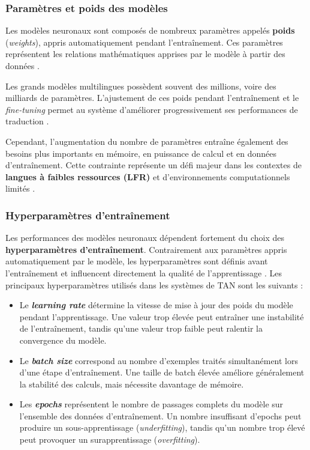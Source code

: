 \subsubsection{Paramètres et poids des modèles}

Les modèles neuronaux sont composés de nombreux paramètres appelés \textbf{poids} (\textit{weights}), appris automatiquement pendant l'entraînement. Ces paramètres représentent les relations mathématiques apprises par le modèle à partir des données \cite{Goodfellow-et-al-2016}.

Les grands modèles multilingues possèdent souvent des millions, voire des milliards de paramètres. L'ajustement de ces poids pendant l'entraînement et le \textit{fine-tuning} permet au système d'améliorer progressivement ses performances de traduction \cite{rakhimov2024enhancing}.

Cependant, l'augmentation du nombre de paramètres entraîne également des besoins plus importants en mémoire, en puissance de calcul et en données d'entraînement. Cette contrainte représente un défi majeur dans les contextes de \textbf{langues à faibles ressources (\ac{LFR})} et d'environnements computationnels limités \cite{agyei2025dynamic}.
\subsubsection{Hyperparamètres d'entraînement}

Les performances des modèles neuronaux dépendent fortement du choix des \textbf{hyperparamètres d'entraînement}. Contrairement aux paramètres appris automatiquement par le modèle, les hyperparamètres sont définis avant l'entraînement et influencent directement la qualité de l'apprentissage \cite{Goodfellow-et-al-2016}. Les principaux hyperparamètres utilisés dans les systèmes de \ac{TAN} sont les suivants :

\begin{itemize}

    \item Le \textbf{\textit{learning rate}} détermine la vitesse de mise à jour des poids du modèle pendant l'apprentissage. Une valeur trop élevée peut entraîner une instabilité de l'entraînement, tandis qu'une valeur trop faible peut ralentir la convergence du modèle.

    \item Le \textbf{\textit{batch size}} correspond au nombre d'exemples traités simultanément lors d'une étape d'entraînement. Une taille de batch élevée améliore généralement la stabilité des calculs, mais nécessite davantage de mémoire.

    \item Les \textbf{\textit{epochs}} représentent le nombre de passages complets du modèle sur l'ensemble des données d'entraînement. Un nombre insuffisant d'epochs peut produire un sous-apprentissage (\textit{underfitting}), tandis qu'un nombre trop élevé peut provoquer un surapprentissage (\textit{overfitting}).

\end{itemize}

